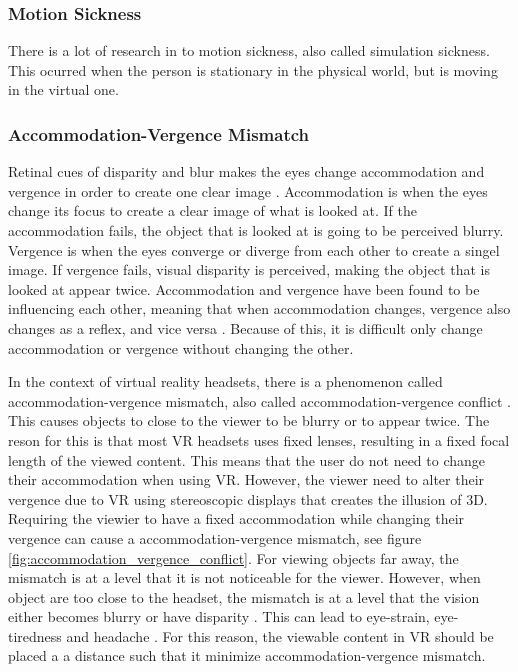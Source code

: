 \documentclass{sigchi}
\begin{document}
\subsubsection{Motion Sickness}
There is a lot of research in to motion sickness, also called simulation sickness. This ocurred when the person is stationary in the physical world, but is moving in the virtual one.

\subsubsection{Accommodation-Vergence Mismatch}
Retinal cues of disparity and blur makes the eyes change accommodation and vergence in order to create one clear image \cite{reichelt_depth_2010}. Accommodation is when the eyes change its focus to create a clear image of what is looked at. If the accommodation fails, the object that is looked at is going to be perceived blurry. Vergence is when the eyes converge or diverge from each other to create a singel image. If vergence fails, visual disparity is perceived, making the object that is looked at appear twice. Accommodation and vergence have been found to be influencing each other, meaning that when accommodation changes, vergence also changes as a reflex, and vice versa \cite{suryakumar_vergence_2007}. Because of this, it is difficult only change accommodation or vergence without changing the other.

In the context of virtual reality headsets, there is a phenomenon called accommodation-vergence mismatch, also called accommodation-vergence conflict \cite{kramida_resolving_2016}. This causes objects to close to the viewer to be blurry or to appear twice. The reson for this is that most VR headsets uses fixed lenses, resulting in a fixed focal length of the viewed content. This means that the user do not need to change their accommodation when using VR. However, the viewer need to alter their vergence due to VR using stereoscopic displays that creates the illusion of 3D. Requiring the viewier to have a fixed accommodation while changing their vergence can cause a accommodation-vergence mismatch, see figure \ref{fig:accommodation_vergence_conflict}. For viewing objects far away, the mismatch is at a level that it is not noticeable for the viewer. However, when object are too close to the headset, the mismatch is at a level that the vision either becomes blurry or have disparity \cite{hoffman_vergenceaccommodation_2008}. This can lead to eye-strain, eye-tiredness and headache \cite{shibata_zone_2011}. For this reason, the viewable content in VR should be placed a a distance such that it minimize accommodation-vergence mismatch.
\end{document}
